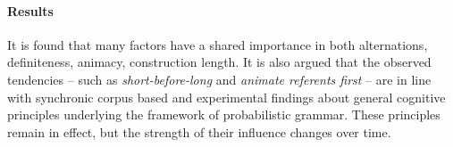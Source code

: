 \begin{svgraybox}
  \vspace{-\baselineskip}\paragraph{Results}\vspace{-0.5\baselineskip}

  It is found that many factors have a shared importance in both alternations, \eg definiteness, animacy, construction length.
  It is also argued that the observed tendencies -- such as \textit{short-before-long} and \textit{animate referents first} -- are in line with synchronic corpus based and experimental findings about general cognitive principles underlying the framework of probabilistic grammar.
  These principles remain in effect, but the strength of their influence changes over time.

\end{svgraybox}

\newpage

